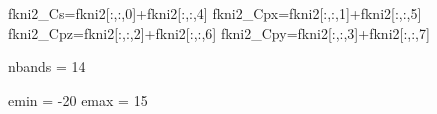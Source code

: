 \documentclass[
  letterpaper,
  DIV=11,
  numbers=noendperiod]{scrreprt}
\newenvironment{Shaded}{\begin{snugshade}}{\end{snugshade}}
\newcommand{\DecValTok}[1]{\textcolor[rgb]{0.68,0.00,0.00}{#1}}
\newcommand{\NormalTok}[1]{\textcolor[rgb]{0.00,0.23,0.31}{#1}}
\newcommand{\OperatorTok}[1]{\textcolor[rgb]{0.37,0.37,0.37}{#1}}
\begin{document}
\begin{Shaded}
\begin{Highlighting}[]
\NormalTok{fkni2\_Cs}\OperatorTok{=}\NormalTok{fkni2[:,:,}\DecValTok{0}\NormalTok{]}\OperatorTok{+}\NormalTok{fkni2[:,:,}\DecValTok{4}\NormalTok{]}
\NormalTok{fkni2\_Cpx}\OperatorTok{=}\NormalTok{fkni2[:,:,}\DecValTok{1}\NormalTok{]}\OperatorTok{+}\NormalTok{fkni2[:,:,}\DecValTok{5}\NormalTok{]}
\NormalTok{fkni2\_Cpz}\OperatorTok{=}\NormalTok{fkni2[:,:,}\DecValTok{2}\NormalTok{]}\OperatorTok{+}\NormalTok{fkni2[:,:,}\DecValTok{6}\NormalTok{]}
\NormalTok{fkni2\_Cpy}\OperatorTok{=}\NormalTok{fkni2[:,:,}\DecValTok{3}\NormalTok{]}\OperatorTok{+}\NormalTok{fkni2[:,:,}\DecValTok{7}\NormalTok{]}
\end{Highlighting}
\end{Shaded}

\begin{Shaded}
\begin{Highlighting}[]
\NormalTok{nbands }\OperatorTok{=} \DecValTok{14}
\end{Highlighting}
\end{Shaded}

\begin{Shaded}
\begin{Highlighting}[]
\NormalTok{emin }\OperatorTok{=} \OperatorTok{{-}}\DecValTok{20}
\NormalTok{emax }\OperatorTok{=} \DecValTok{15}
\end{Highlighting}
\end{Shaded}
\end{document}
